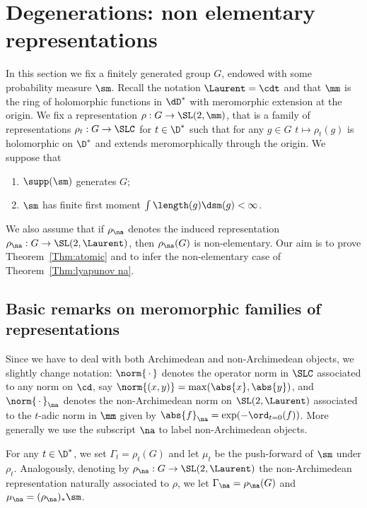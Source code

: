 \section{Degenerations: non elementary representations}\label{sec:non elem}

In this section we fix a finitely generated group $G$, endowed with some probability measure $\sm$. Recall the notation $\Laurent = \cdt$ and that $\mm$ is the ring of holomorphic functions in $\dD^*$ with meromorphic extension at the origin. We fix a representation $\rho: G\to \SL(2, \mm)$, that is a family of representations $\rho_t : G \to \SLC$ for $t\in \D^*$ such that for any $g\in G$ $ t\mapsto \rho_t(g)$ is holomorphic on $\D^*$ and extends meromorphically through the origin. We suppose that
\begin{enumerate}\renewcommand{\theenumi}{A\arabic{enumi}}
\item \label{A1b} $\supp(\sm)$ generates $G$;
\item \label{A2b} $\sm$ has finite first moment $\int \length(g) \dsm(g)<\infty$.
\end{enumerate}

We also assume that if $\rho_\na$ denotes the induced representation $\rho_\na: G \to \SL(2,\Laurent)$, then $\rho_\na(G)$ is non-elementary. Our aim is to prove Theorem~\ref{Thm:atomic} and to infer the non-elementary case of Theorem~\ref{Thm:lyapunov na}.

\subsection{Basic remarks on meromorphic families of representations}

Since we have to deal with both Archimedean and non-Archimedean objects, we slightly change notation: $\norm{{\,\cdot\,}}$ denotes the operator norm in $\SLC$ associated to any norm on $\cd$, say $\norm{(x,y)} =\max({\abs{x}, \abs{y}})$, and $\norm{{\,\cdot\,}}_{\na}$ denotes the non-Archimedean norm on $\SL(2, \Laurent)$ associated to the $t$-adic norm in $\mm$ given by $\abs{f}_\na = \exp(-\ord_{t=0}(f))$. More generally we use the subscript $\na$ to label non-Archimedean objects.

For any $t\in \D^*$, we set $ \Gamma_t =\rho_t(G)$ and let $\mu_t$ be the push-forward of $\sm$ under $\rho_t$. Analogously, denoting by $\rho_\na:G\to \SL(2, \Laurent)$ the non-Archimedean representation naturally associated to $\rho$, we let $\Gamma_\na = \rho_\na(G)$ and $\mu_\na = (\rho_\na)_*\sm$.

